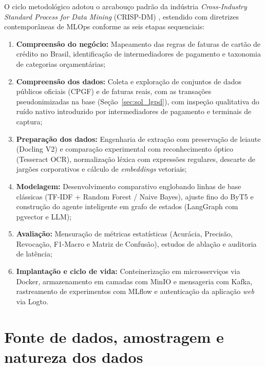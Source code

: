 O ciclo metodológico adotou o arcabouço padrão da indústria \textit{Cross-Industry Standard Process for Data Mining} (CRISP-DM) \cite{chapman2000crisp, wirth2000crisp}, estendido com diretrizes contemporâneas de MLOps \cite{kreuzberger2022mlops} conforme as seis etapas sequenciais:
\begin{enumerate}
	\item \textbf{Compreensão do negócio:} Mapeamento das regras de faturas de cartão de crédito no Brasil, identificação de intermediadores de pagamento e taxonomia de categorias orçamentárias;
	\item \textbf{Compreensão dos dados:} Coleta e exploração de conjuntos de dados públicos oficiais (CPGF) e de faturas reais, com as transações pseudonimizadas na base (Seção~\ref{sec:sol_lgpd}), com inspeção qualitativa do ruído nativo introduzido por intermediadores de pagamento e terminais de captura;
	\item \textbf{Preparação dos dados:} Engenharia de extração com preservação de leiaute (Docling V2) e comparação experimental com reconhecimento óptico (Tesseract OCR), normalização léxica com expressões regulares, descarte de jargões corporativos e cálculo de \textit{embeddings} vetoriais;
	\item \textbf{Modelagem:} Desenvolvimento comparativo englobando linhas de base clássicas (TF-IDF + Random Forest / Naive Bayes), ajuste fino do ByT5 e construção do agente inteligente em grafo de estados (LangGraph com pgvector e LLM);
	\item \textbf{Avaliação:} Mensuração de métricas estatísticas (Acurácia, Precisão, Revocação, F1-Macro e Matriz de Confusão), estudos de ablação e auditoria de latência;
	\item \textbf{Implantação e ciclo de vida:} Conteinerização em microsserviços via Docker, armazenamento em camadas com MinIO e mensageria com Kafka, rastreamento de experimentos com MLflow \cite{zaharia2018mlflow} e autenticação da aplicação \textit{web} via Logto.
\end{enumerate}

\section{Fonte de dados, amostragem e natureza dos dados}
\label{sec:sol_fonte_dados}

